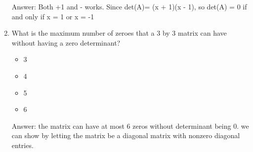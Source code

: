 \documentclass{article}
\begin{document}
\begin{enumerate}
        Answer: Both +1 and - works. Since det(A)= (x + 1)(x - 1), so det(A) = 0 if and only if x = 1 or x = -1
    
    \item What is the maximum number of zeroes that a 3 by 3 matrix can have without having a zero determinant? 
    
        \begin{itemize}
            \item 3
            \item 4
            \item 5
            \item 6
        \end{itemize} 
        
        Answer: the matrix can have at most 6 zeros without determinant being 0. we can show by letting the matrix be a diagonal matrix with nonzero diagonal entries.
    
\end{enumerate}
\end{document}
